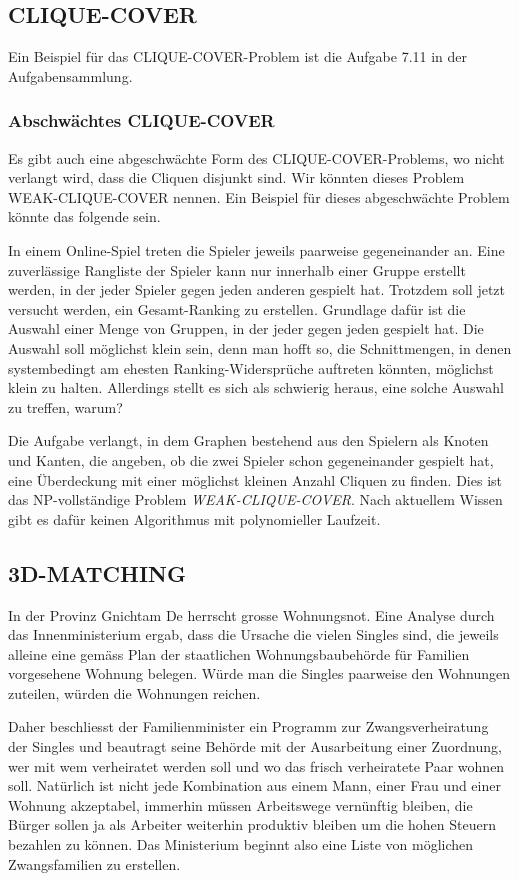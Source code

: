 \subsection{CLIQUE-COVER}
Ein Beispiel für das CLIQUE-COVER-Problem ist die Aufgabe 7.11 in der
Aufgabensammlung.

\subsubsection{Abschwächtes CLIQUE-COVER}
Es gibt auch eine abgeschwächte Form des CLIQUE-COVER-Problems, wo
nicht verlangt wird, dass die Cliquen disjunkt sind.
Wir könnten dieses Problem WEAK-CLIQUE-COVER nennen.
Ein Beispiel für dieses abgeschwächte Problem könnte das folgende sein.

\medskip

In einem Online-Spiel treten die Spieler jeweils paarweise gegeneinander an.
Eine zuverlässige Rangliste der Spieler kann nur innerhalb
einer Gruppe erstellt werden, in der jeder Spieler gegen
jeden anderen gespielt hat. Trotzdem soll jetzt versucht werden,
ein Gesamt-Ranking zu erstellen. Grundlage dafür ist die Auswahl
einer Menge von Gruppen, in der jeder gegen jeden gespielt hat.
Die Auswahl soll möglichst klein sein, denn man hofft so, die
Schnittmengen, in denen systembedingt am ehesten Ranking-Widersprüche
auftreten könnten, möglichst klein zu halten. Allerdings stellt es
sich als schwierig heraus, eine solche Auswahl zu treffen, warum?

\medskip

Die Aufgabe verlangt, in dem Graphen bestehend aus den Spielern
als Knoten und Kanten, die angeben, ob die zwei Spieler schon gegeneinander
gespielt hat, eine Überdeckung mit einer möglichst
kleinen Anzahl Cliquen zu finden. Dies ist das NP-vollständige Problem
{\it WEAK-CLIQUE-COVER}. Nach aktuellem Wissen gibt es dafür keinen
Algorithmus mit polynomieller Laufzeit.

\subsection{3D-MATCHING}
In der Provinz Gnichtam De herrscht grosse Wohnungsnot.
Eine Analyse durch das Innenministerium ergab, dass die Ursache
die vielen Singles sind, die jeweils alleine eine gemäss
Plan der staatlichen Wohnungsbaubehörde für Familien vorgesehene
Wohnung belegen.
Würde man die Singles paarweise den Wohnungen zuteilen, würden die
Wohnungen reichen.

Daher beschliesst der Familienminister ein Programm zur Zwangsverheiratung
der Singles und beautragt seine Behörde mit der Ausarbeitung einer Zuordnung,
wer mit wem verheiratet werden soll und wo das frisch verheiratete Paar
wohnen soll.
Natürlich ist nicht jede Kombination aus einem Mann,
einer Frau und einer Wohnung akzeptabel, immerhin müssen 
Arbeitswege vernünftig bleiben, die Bürger sollen ja als 
Arbeiter weiterhin produktiv bleiben um die hohen Steuern bezahlen zu können.
Das Ministerium beginnt also eine Liste von möglichen Zwangsfamilien
zu erstellen.


